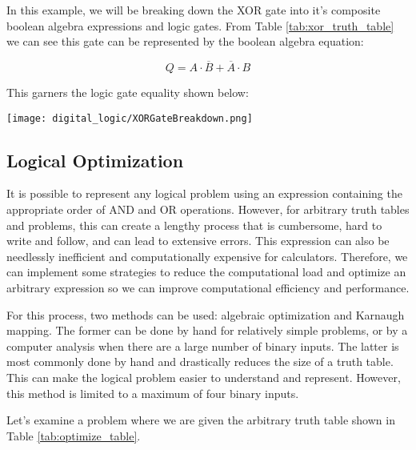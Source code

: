 \begin{example}
    In this example, we will be breaking down the XOR gate into it's composite boolean algebra expressions and logic gates.
    From Table \ref{tab:xor_truth_table} we can see this gate can be represented by the boolean algebra equation:
    
    \begin{equation*}
        Q = A \cdot \overline{B} + \overline{A} \cdot B
    \end{equation*}
    
    This garners the logic gate equality shown below:

    \texttt{[image: digital\_logic/XORGateBreakdown.png]}
\end{example}

    \subsection[]{Logical Optimization}
    It is possible to represent any logical problem using an expression containing the appropriate order of AND and OR operations.
    However, for arbitrary truth tables and problems, this can create a lengthy process that is cumbersome, hard to write and follow, and can lead to extensive errors.
    This expression can also be needlessly inefficient and computationally expensive for calculators.
    Therefore, we can implement some strategies to reduce the computational load and optimize an arbitrary expression so we can improve computational efficiency and performance.

    For this process, two methods can be used: algebraic optimization and Karnaugh mapping.
    The former can be done by hand for relatively simple problems, or by a computer analysis when there are a large number of binary inputs.
    The latter is most commonly done by hand and drastically reduces the size of a truth table.
    This can make the logical problem easier to understand and represent.
    However, this method is limited to a maximum of four binary inputs.

    Let's examine a problem where we are given the arbitrary truth table shown in Table \ref{tab:optimize_table}.

